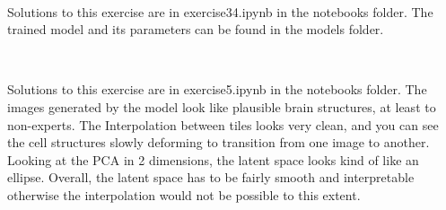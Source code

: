 \documentclass[12pt]{article}
\begin{document}
\\
\begin{exercise}
	Solutions to this exercise are in exercise34.ipynb in the notebooks folder. The trained model and its parameters can be found in the models folder.\\
\end{exercise}
\\
\begin{exercise}
	Solutions to this exercise are in exercise5.ipynb in the notebooks folder. The images generated by the model look like plausible brain structures, at least to non-experts. The Interpolation between tiles looks very clean, and you can see the cell structures slowly deforming to transition from one image to another. Looking at the PCA in 2 dimensions, the latent space looks kind of like an ellipse. Overall, the latent space has to be fairly smooth and interpretable otherwise the interpolation would not be possible to this extent.\\
\end{exercise}

\end{document}
